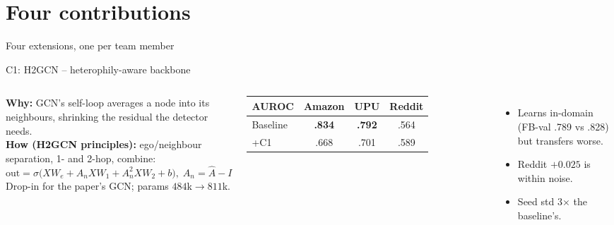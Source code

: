 \documentclass[aspectratio=169,11pt]{beamer}
\begin{document}
\section{Four contributions}
\begin{frame}{Four extensions, one per team member}
\centering
{}
\end{frame}

\begin{frame}{C1: H2GCN -- heterophily-aware backbone}
\begin{columns}[T]
\textbf{Why:} GCN's self-loop averages a node into its neighbours, shrinking the residual the detector needs.\\[4pt]
\textbf{How (H2GCN principles):} ego/neighbour separation, 1- and 2-hop, combine:
\[
\text{out}=\sigma\big(XW_{e}+A_nXW_1+A_n^2XW_2+b\big),\; A_n=\hat A-I
\]
Drop-in for the paper's GCN; params $484$k$\to811$k.
\small
\begin{tabular}{lccc}
\toprule
AUROC & Amazon & UPU & Reddit\\ \midrule
Baseline & \textbf{.834} & \textbf{.792} & .564\\
+C1 & \textcolor{bad}{.668} & \textcolor{bad}{.701} & .589\\ \bottomrule
\end{tabular}\\[4pt]
\begin{itemize}\footnotesize
\item Learns in-domain (FB-val .789 vs .828) but \alert{transfers worse}.
\item Reddit $+0.025$ is within noise.
\item Seed std 3$\times$ the baseline's.
\end{itemize}
\end{columns}
\end{frame}
\end{document}

